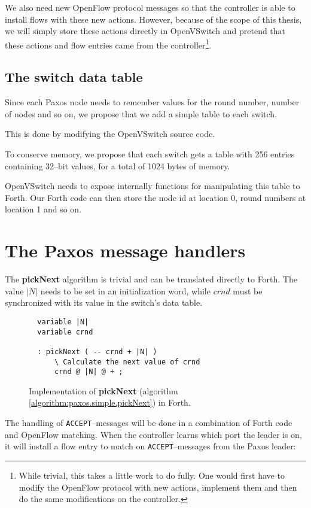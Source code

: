 We also need new OpenFlow protocol messages so that the controller is able
to install flows with these new actions.  However, because of the scope of
this thesis, we will simply store these actions directly in OpenVSwitch and
pretend that these actions and flow entries came from the
controller\footnote{While trivial, this takes a little work to do fully.
One would first have to modify the OpenFlow protocol with new actions,
implement them and then do the same modifications on the controller.}.

\subsection{The switch data table}

Since each Paxos node needs to remember values for the round number, number
of nodes and so on, we propose that we add a simple table to each switch.

This is done by modifying the OpenVSwitch source code.

To conserve memory, we propose that each switch gets a table with 256
entries containing 32--bit values, for a total of 1024 bytes of memory.

OpenVSwitch needs to expose internally functions for manipulating this table
to Forth.  Our Forth code can then store the node id at location 0, round
numbers at location 1 and so on.

\section{The Paxos message handlers}

The \textbf{pickNext} algorithm is trivial and can be translated directly to
Forth.  The value $|N|$ needs to be set in an initialization word,
while $crnd$ must be synchronized with its value in the switch's data table.

\begin{figure}[H]
  \centering
  \begin{Verbatim}
  variable |N|
  variable crnd

  : pickNext ( -- crnd + |N| )
      \ Calculate the next value of crnd
      crnd @ |N| @ + ;
  \end{Verbatim}
  \caption{Implementation of \textbf{pickNext} (algorithm
      \ref{algorithm:paxos.simple.pickNext}) in Forth.}
  \label{program.forth.pickNext}
\end{figure}

The handling of \texttt{ACCEPT}--messages will be done in a combination of
Forth code and OpenFlow matching.  When the controller learns which port the
leader is on, it will install a flow entry to match on
\texttt{ACCEPT}--messages from the Paxos leader:


